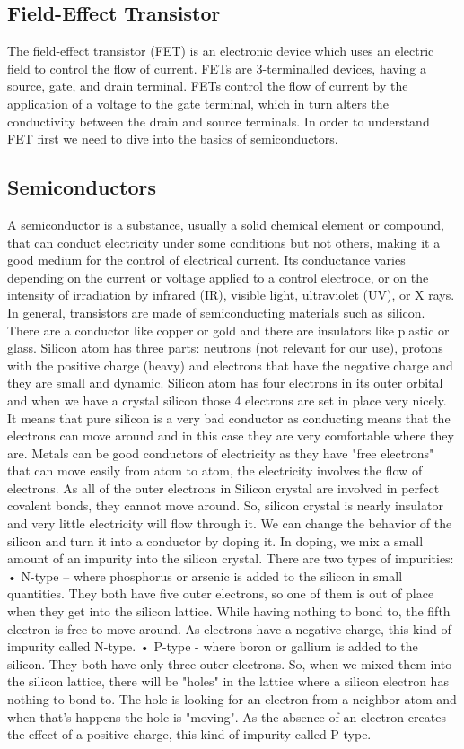 \subsection{ Field-Effect Transistor }
The field-effect transistor (FET) is an electronic device which uses an electric field to control the flow of current. FETs are 3-terminalled devices, having a source, gate, and drain terminal. FETs control the flow of current by the application of a voltage to the gate terminal, which in turn alters the conductivity between the drain and source terminals.
In order to understand FET first we need to dive into the basics of semiconductors.
\subsection{ Semiconductors }
A semiconductor is a substance, usually a solid chemical element or compound, that can conduct electricity under some conditions but not others, making it a good medium for the control of electrical current. Its conductance varies depending on the current or voltage applied to a control electrode, or on the intensity of irradiation by infrared (IR), visible light, ultraviolet (UV), or X rays.
In general, transistors are made of semiconducting materials such as silicon. There are a conductor like copper or gold and there are insulators like plastic or glass. 
Silicon atom has three parts: neutrons (not relevant for our use), protons with the positive charge (heavy) and electrons that have the negative charge and they are small and dynamic. Silicon atom has four electrons in its outer orbital and when we have a crystal silicon those 4 electrons are set in place very nicely. It means that pure silicon is a very bad conductor as  conducting means that the electrons can move around and in this case they are very comfortable where they are.
Metals can be good conductors of electricity as they have "free electrons" that can move easily from atom to atom, the electricity involves the flow of electrons. As all of the outer electrons in Silicon crystal are involved in perfect covalent bonds, they cannot move around. So, silicon crystal is nearly insulator and very little electricity will flow through it.
We can change the behavior of  the silicon and turn it into a conductor by doping it. In doping, we mix a small amount of an impurity into the silicon crystal.
There are two types of impurities:
•	N-type – where phosphorus or arsenic is added to the silicon in small quantities. They both have  five outer electrons, so one of them is out of place when they get into the silicon lattice. While having nothing to bond to, the fifth electron is free to move around. As electrons have a negative charge, this kind of impurity called N-type.
•	P-type - where boron or gallium is added to the silicon. They both have only three outer electrons. So, when we mixed them into the silicon lattice, there will be "holes" in the lattice where a silicon electron has nothing to bond to. The hole is looking for an electron from a neighbor atom and when that’s happens the hole is "moving". As the absence of an electron creates the effect of a positive charge, this kind of impurity called P-type.
